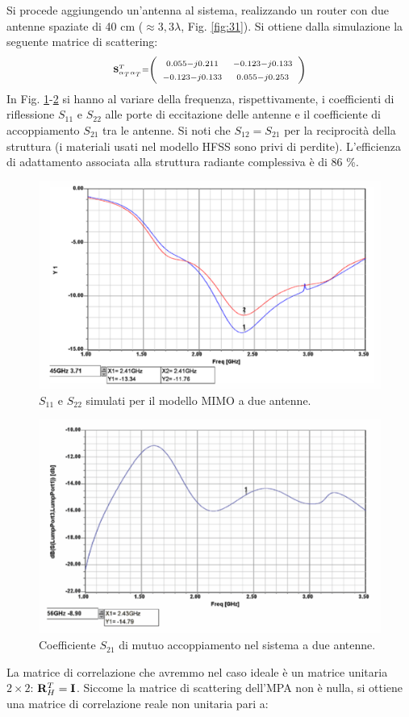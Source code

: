 \documentclass[technote]{IEEEtran}
\begin{document}
\par Si procede aggiungendo un'antenna al sistema, realizzando un router con due antenne spaziate di 40 cm ($\approx 3,3 \lambda$, Fig. \ref{fig:31}). Si ottiene dalla simulazione la seguente matrice di scattering:
\[ \scriptstyle { {\bf{S}}_{{\alpha _T}{\alpha _T}}^T = \left( {\begin{array}{*{20}{c}} \scriptstyle
{0.055 - j0.211}&\scriptstyle{ - 0.123 - j0.133}\\
\scriptstyle{ - 0.123 - j0.133}&\scriptstyle{0.055 - j0.253}
\end{array}} \right) } \] In Fig. \ref{fig:32}-\ref{fig:33} si hanno al variare della frequenza, rispettivamente, i coefficienti di riflessione $S_{11}$ e $S_{22}$ alle porte di eccitazione delle antenne e il coefficiente di accoppiamento $S_{21}$ tra le antenne. Si noti che $S_{12}=S_{21}$ per la reciprocità della struttura (i materiali usati nel modello HFSS sono privi di perdite).
L'efficienza di adattamento associata alla struttura radiante complessiva è di 86 \%.
\begin{figure}[!ht]
\centering
\includegraphics[width=.9\columnwidth]{figure32}
\caption{$S_{11}$ e $S_{22}$ simulati per il modello MIMO a due antenne.}
\label{fig:32}
\end{figure}
\begin{figure}[!ht]
\centering
\includegraphics[width=0.9\columnwidth]{figure33}
\caption{Coefficiente $S_{21}$ di mutuo accoppiamento nel sistema a due antenne.}
\label{fig:33}
\end{figure} La matrice di correlazione che avremmo nel caso ideale è un matrice unitaria $2 \times 2$: ${\bf{R}}_H^T = {\bf{I}}$. Siccome la matrice di scattering dell'MPA non è nulla, si ottiene una matrice di correlazione reale non unitaria pari a:
\end{document}
